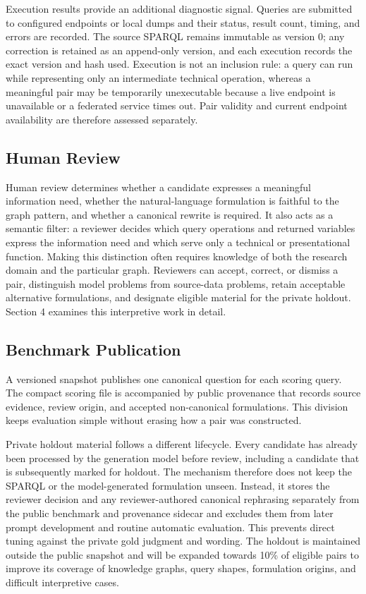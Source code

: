 Execution results provide an additional diagnostic signal. Queries are submitted to configured endpoints or local dumps and their status, result count, timing, and errors are recorded. The source SPARQL remains immutable as version 0; any correction is retained as an append-only version, and each execution records the exact version and hash used. Execution is not an inclusion rule: a query can run while representing only an intermediate technical operation, whereas a meaningful pair may be temporarily unexecutable because a live endpoint is unavailable or a federated service times out. Pair validity and current endpoint availability are therefore assessed separately.

\subsection{Human Review}\label{human-review}

Human review determines whether a candidate expresses a meaningful information need, whether the natural-language formulation is faithful to the graph pattern, and whether a canonical rewrite is required. It also acts as a semantic filter: a reviewer decides which query operations and returned variables express the information need and which serve only a technical or presentational function. Making this distinction often requires knowledge of both the research domain and the particular graph. Reviewers can accept, correct, or dismiss a pair, distinguish model problems from source-data problems, retain acceptable alternative formulations, and designate eligible material for the private holdout. Section 4 examines this interpretive work in detail.

\subsection{Benchmark Publication}\label{benchmark-publication}

A versioned snapshot publishes one canonical question for each scoring query. The compact scoring file is accompanied by public provenance that records source evidence, review origin, and accepted non-canonical formulations. This division keeps evaluation simple without erasing how a pair was constructed.

Private holdout material follows a different lifecycle. Every candidate has already been processed by the generation model before review, including a candidate that is subsequently marked for holdout. The mechanism therefore does not keep the SPARQL or the model-generated formulation unseen. Instead, it stores the reviewer decision and any reviewer-authored canonical rephrasing separately from the public benchmark and provenance sidecar and excludes them from later prompt development and routine automatic evaluation. This prevents direct tuning against the private gold judgment and wording. The holdout is maintained outside the public snapshot and will be expanded towards 10\% of eligible pairs to improve its coverage of knowledge graphs, query shapes, formulation origins, and difficult interpretive cases.

